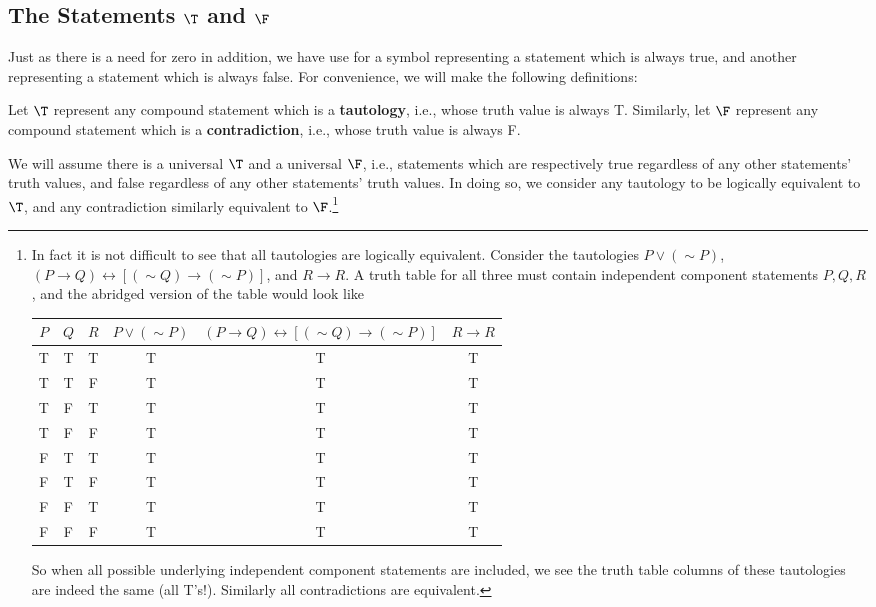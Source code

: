


\newpage

\subsection{The Statements $\T$  and $\F$}
Just as there is a need for zero in addition, we have use for
a symbol representing  a statement which is always true, and another
representing a statement which is always false.
For convenience, we will make the following definitions:
\begin{definition} Let $\T$ represent any compound statement which
is a {\bf tautology}, i.e., whose truth value is
always {\rm T}.
Similarly, let $\F$ represent any compound statement which
is a {\bf contradiction}, i.e.,
whose truth value is always {\rm F}.\end{definition}

We will assume there is a universal $\T$ and a universal $\F$,
i.e., statements which are respectively true regardless
of any other statements' truth values, and false
regardless of any other statements' truth values.
In doing so, we consider any tautology to be logically equivalent to
$\T$, and any contradiction similarly equivalent to $\F$.\footnote{%
In fact it is not difficult to see that all tautologies are
logically equivalent.  Consider the tautologies
$P\vee(\sim P)$,
$(P\longrightarrow Q)\longleftrightarrow[(\sim Q)\longrightarrow(\sim P)]$,
and $R\longrightarrow R$.  A truth table for all three 
must contain independent
component statements $P,Q,R$,
and the abridged version of the table would look like
\begin{center}
\begin{tabular}{|c|c|c||c|c|c|}
\hline
$P$&$Q$&$R$&$P\vee(\sim P)$&$(P\longrightarrow Q)
     \longleftrightarrow[(\sim Q)\longrightarrow(\sim P)]$&
     $R\longrightarrow R$\\ \hline
T&T&T&T&T&T\\
T&T&F&T&T&T\\
T&F&T&T&T&T\\
T&F&F&T&T&T\\ \hline
F&T&T&T&T&T\\
F&T&F&T&T&T\\
F&F&T&T&T&T\\
F&F&F&T&T&T\\ \hline
\end{tabular}\end{center}
So when all possible underlying independent component statements are
included, we see the truth table columns of these tautologies
are indeed the same (all T's!).  Similarly all contradictions are
equivalent.
} 


